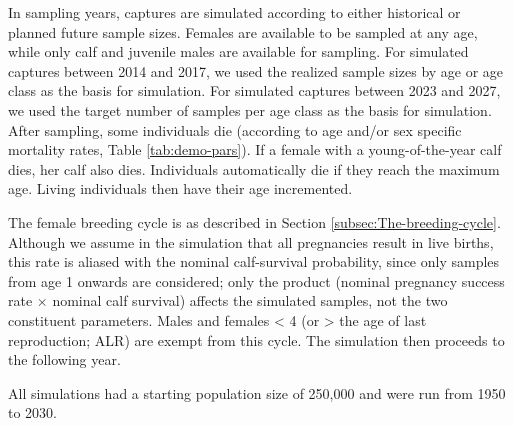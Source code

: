 In sampling years, captures are simulated according to either historical
or planned future sample sizes. Females are available to be sampled
at any age, while only calf and juvenile males are available for sampling.
For simulated captures between 2014 and 2017, we used the realized
sample sizes by age or age class as the basis for simulation. For
simulated captures between 2023 and 2027, we used the target number
of samples per age class as the basis for simulation. After sampling,
some individuals die (according to age and/or sex specific mortality
rates, Table \ref{tab:demo-pars}). If a female with a young-of-the-year
calf dies, her calf also dies. Individuals automatically die if they
reach the maximum age. Living individuals then have their age incremented.

The female breeding cycle is as described in Section \ref{subsec:The-breeding-cycle}.
Although we assume in the simulation that all pregnancies result in
live births, this rate is aliased with the nominal calf-survival probability,
since only samples from age 1 onwards are considered; only the product
(nominal pregnancy success rate $\times$ nominal calf survival) affects
the simulated samples, not the two constituent parameters. Males and
females < 4 (or > the age of last reproduction; ALR) are exempt from
this cycle. The simulation then proceeds to the following year.

All simulations had a starting population size of 250,000 and were
run from 1950 to 2030. 

